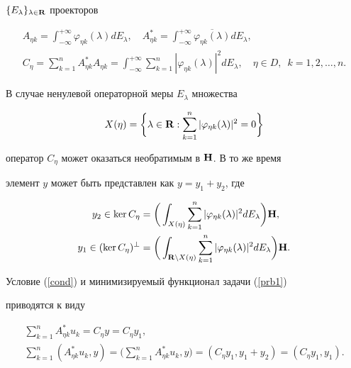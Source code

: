 $\{E_\lambda \}_{\lambda \in {\bold R}}$ проекторов


\begin{gather*}


A_{\eta k}=\int_{-\infty }^{+\infty }\varphi_{\eta k}( \lambda)


dE_\lambda,\quad A_{\eta k}^{*}=\int_{-\infty }^{+\infty }\overline{


\varphi_{\eta k}( \lambda ) }dE_\lambda, \\


%


C_\eta =\sum_{k=1}^nA_{\eta k}^{*}A_{\eta k}=\int_{-\infty }^{+\infty


}\sum_{k=1}^n| \varphi_{\eta k}( \lambda )|


^2dE_\lambda, \quad


\eta \in D,\ \; k=1,2,\dotsc,n. 


\end{gather*}


В случае ненулевой операторной меры $E_{\lambda}$ множества


$$


X(\eta) =\bigg\{ \lambda \in {\bold R}:\sum_{k=1}^n| \varphi


_{\eta k}( \lambda ) |^2=0\bigg\} 


$$


оператор $C_\eta $ может оказаться необратимым в ${\bold H}$. В то же время 


элемент $y$ может быть представлен как $y=y_1+y_2$, где 


\begin{align*}


y_2\in \ker C_\eta &=\bigg(\int_{X( \eta)


}\sum_{k=1}^n| \varphi_{\eta k}( \lambda )|


^2dE_\lambda\bigg) {\bold H,} \\


%


y_1\in ( \ker C_\eta )^{\bot }&=\bigg(\int_{{\bold R}


\setminus X( \eta ) }\sum_{k=1}^n| \varphi_{\eta k}(


\lambda ) |^2dE_\lambda \bigg) {\bold H.} 


\end{align*}


Условие (\ref{cond}) и минимизируемый функционал задачи (\ref{prb1})


приводятся к виду 


\begin{gather*}


\sum_{k=1}^nA_{\eta k}^{*}u_k=C_\eta y=C_\eta y_1, \\


\sum_{k=1}^n( A_{\eta k}^{*}u_k,y) =\bigg( \sum_{k=1}^nA_{\eta


k}^{*}u_k,y\bigg) =( C_\eta y_1,y_1+y_2) =( C_\eta


y_1,y_1). 


\end{gather*}


